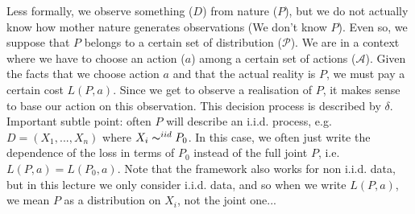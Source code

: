 \documentclass[12pt]{report}
\begin{document}
Less formally, we observe something ($D$) from nature ($P$), but we do not actually know how mother nature generates observations (We don't know $P$). Even so, we suppose that $P$ belongs to a certain set of distribution ($\mathcal{P}$). We are in a context where we have to choose an action ($a$) among a certain set of actions ($\mathcal{A}$). Given the facts that we choose action $a$ and that the actual reality is $P$, we must pay a certain cost $L(P,a)$. Since we get to observe  a realisation of $P$, it makes sense to base our action on this observation. This decision process is described by $\delta$.\\

Important subtle point: often $P$ will describe an i.i.d. process, e.g. $D = (X_1,...,X_n)$ where $X_i \thicksim^{iid} P_0$. In this case, we often just write the dependence of the loss in terms of $P_0$ instead of the full joint $P$, i.e. $L(P,a) = L(P_0,a)$. Note that the framework also works for non i.i.d. data, but in this lecture we only consider i.i.d. data, and so when we write $L(P,a)$, we mean $P$ as a distribution on $X_i$, not the joint one...
\end{document}
